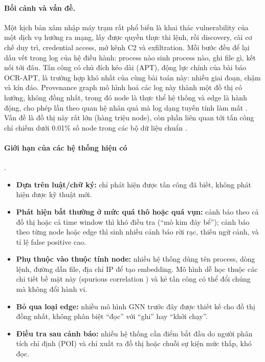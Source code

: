 \paragraph{Bối cảnh và vấn đề.}
Một kịch bản xâm nhập máy trạm rất phổ biến là khai thác vulnerability của một dịch vụ hướng ra mạng, lấy được quyền thực thi lệnh, rồi discovery, cài cơ chế duy trì, credential access, mở kênh C2 và exfiltration. Mỗi bước đều để lại dấu vết trong log của hệ điều hành: process nào sinh process nào, ghi file gì, kết nối tới đâu. Tấn công có chủ đích kéo dài (APT), động lực chính của bài báo OCR-APT, là trường hợp khó nhất của cùng bài toán này: nhiều giai đoạn, chậm và kín đáo. Provenance graph mô hình hoá các log này thành một đồ thị có hướng, không đồng nhất, trong đó node là thực thể hệ thống và edge là hành động, cho phép lần theo quan hệ nhân quả mà log dạng tuyến tính làm mất \cite{zipperle2022survey}. Vấn đề là đồ thị này rất lớn (hàng triệu node), còn phần liên quan tới tấn công chỉ chiếm dưới 0.01\% số node trong các bộ dữ liệu chuẩn \cite{aly2025ocrapt}.

\paragraph{Giới hạn của các hệ thống hiện có} \cite[§1--2]{aly2025ocrapt}.
\begin{itemize}
    \item \textbf{Dựa trên luật/chữ ký:} chỉ phát hiện được tấn công đã biết, không phát hiện được kỹ thuật mới.
    \item \textbf{Phát hiện bất thường ở mức quá thô hoặc quá vụn:} cảnh báo theo cả đồ thị hoặc cả time window thì khó điều tra (``mò kim đáy bể''); cảnh báo theo từng node hoặc edge thì sinh nhiều cảnh báo rời rạc, thiếu ngữ cảnh, và tỉ lệ false positive cao.
    \item \textbf{Phụ thuộc vào thuộc tính node:} nhiều hệ thống dùng tên process, dòng lệnh, đường dẫn file, địa chỉ IP để tạo embedding. Mô hình dễ học thuộc các chi tiết bề mặt này (spurious correlation \cite{arp2022dos}) và kẻ tấn công có thể đổi chúng mà không đổi hành vi.
    \item \textbf{Bỏ qua loại edge:} nhiều mô hình GNN trước đây được thiết kế cho đồ thị đồng nhất, không phân biệt ``đọc'' với ``ghi'' hay ``khởi chạy''.
    \item \textbf{Điều tra sau cảnh báo:} nhiều hệ thống cần điểm bắt đầu do người phân tích chỉ định (POI) và chỉ xuất ra đồ thị hoặc chuỗi sự kiện mức thấp, khó đọc.
\end{itemize}

